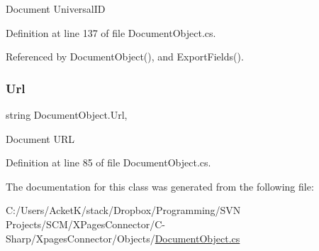 Document Universal\+ID 



Definition at line 137 of file Document\+Object.\+cs.



Referenced by Document\+Object(), and Export\+Fields().

\mbox{\label{class_document_object_ac86b730cf8931b2221af577d32ca2f31}} 
\subsubsection{\texorpdfstring{Url}{Url}}
{\footnotesize\ttfamily string Document\+Object.\+Url\hspace{0.3cm}{\ttfamily [get]}, {\ttfamily [set]}}



Document U\+RL 



Definition at line 85 of file Document\+Object.\+cs.



The documentation for this class was generated from the following file\+:\begin{DoxyCompactItemize}
\item 
C\+:/\+Users/\+Acket\+K/stack/\+Dropbox/\+Programming/\+S\+V\+N Projects/\+S\+C\+M/\+X\+Pages\+Connector/\+C-\/\+Sharp/\+Xpages\+Connector/\+Objects/\hyperlink{_document_object_8cs}{Document\+Object.\+cs}\end{DoxyCompactItemize}
